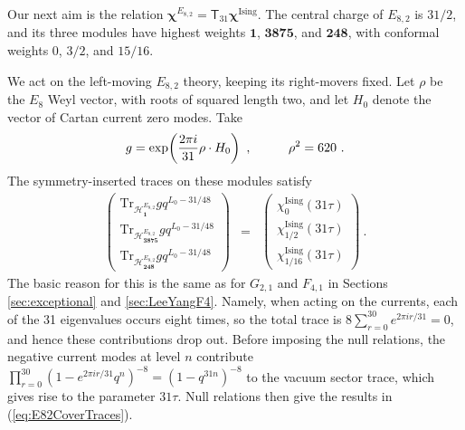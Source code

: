\documentclass[12pt]{article}
\numberwithin{equation}{section}
\newcommand{\bea}{\begin{eqnarray}}
\newcommand{\eea}{\end{eqnarray}}
\def\cH{\mathcal{H}}
\newcommand{\Tr}{\mathrm{Tr}}
\theoremstyle{remark}
\begin{document}
Our next aim is the relation $\boldsymbol{\chi}^{E_{8,2}}=\mathsf T_{31}\boldsymbol{\chi}^{\mathrm{Ising}}$. The central charge of $E_{8,2}$ is $31/2$, and its three modules have highest weights $\mathbf1$, $\mathbf{3875}$, and $\mathbf{248}$, with conformal weights $0$, $3/2$, and $15/16$. 

We act on the left-moving $E_{8,2}$ theory, keeping its right-movers fixed. Let $\rho$ be the $E_8$ Weyl vector, with roots of squared length two, and let $H_0$ denote the vector of Cartan current zero modes. Take
\bea
\label{eq:E82sym}
g=\exp\!\left({2\pi i\over31}\rho\cdot H_0\right)~,
\hspace{0.4 in}\rho^2=620~.
\eea
The symmetry-inserted traces on these modules satisfy
 \bea 
 \label{eq:E82CoverTraces}
\begin{pmatrix}
\Tr_{\cH^{E_{8,2}}_{\mathbf1}}gq^{L_0-31/48}\\
\Tr_{\cH^{E_{8,2}}_{\mathbf{3875}}}gq^{L_0-31/48}\\
\Tr_{\cH^{E_{8,2}}_{\mathbf{248}}}gq^{L_0-31/48}
\end{pmatrix}
&=&\begin{pmatrix}
\chi^{\mathrm{Ising}}_0(31\tau)\\
\chi^{\mathrm{Ising}}_{1/2}(31\tau)\\
\chi^{\mathrm{Ising}}_{1/16}(31\tau)
\end{pmatrix}~.
\eea
The basic reason for this is the same as for $G_{2,1}$ and $F_{4,1}$ in Sections \ref{sec:exceptional} and \ref{sec:LeeYangF4}.  Namely, when acting on the currents, each of the 31 eigenvalues occurs eight times, so the total trace is $8\sum_{r=0}^{30}e^{2\pi i r/31}=0$, and hence these contributions drop out. Before imposing the null relations, the negative current modes at level $n$ contribute $\prod_{r=0}^{30}(1-e^{2\pi ir/31}q^n)^{-8}=(1-q^{31n})^{-8}$ to the vacuum sector trace, which gives rise to the parameter $31\tau$. Null relations then give the results in (\ref{eq:E82CoverTraces}). 
\end{document}
